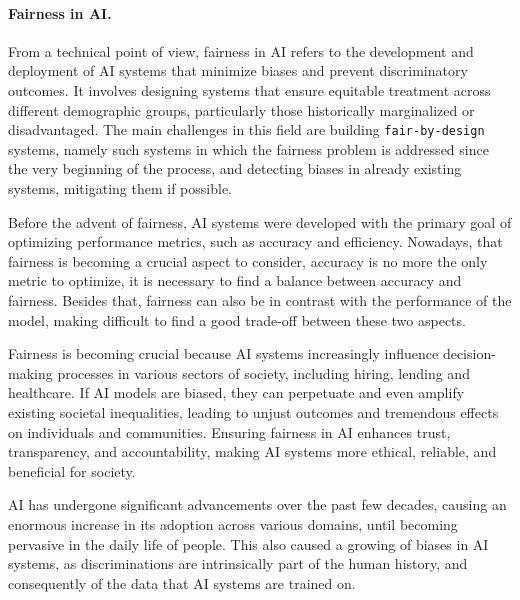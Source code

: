 \documentclass[12pt,a4paper,openright,twoside]{book}
\begin{document}
\paragraph{Fairness in \acs{AI}.}

From a technical point of view, fairness in \ac{AI} refers to the development and deployment of \ac{AI} systems that minimize biases and prevent discriminatory outcomes.
%
It involves designing systems that ensure equitable treatment across different demographic groups, particularly those historically marginalized or disadvantaged.
%
%
The main challenges in this field are building \texttt{fair-by-design} systems, namely such systems in which the fairness problem is addressed since the very beginning of the process, and detecting biases in already existing systems, mitigating them if possible.
%

Before the advent of fairness, \ac{AI} systems were developed with the primary goal of optimizing performance metrics, such as accuracy and efficiency. Nowadays, that fairness is becoming a crucial aspect to consider, accuracy is no more the only metric to optimize, it is necessary to find a balance between accuracy and fairness. Besides that, fairness can also be in contrast with the performance of the model, making difficult to find a good trade-off between these two aspects.

Fairness is becoming crucial because \ac{AI} systems increasingly influence decision-making processes in various sectors of society, including hiring, lending and healthcare.
%
If \ac{AI} models are biased, they can perpetuate and even amplify existing societal inequalities, leading to unjust outcomes and tremendous effects on individuals and communities.
%
Ensuring fairness in \ac{AI} enhances trust, transparency, and accountability, making \ac{AI} systems more ethical, reliable, and beneficial for society.

\ac{AI} has undergone significant advancements over the past few decades, causing an enormous increase in its adoption across various domains, until becoming pervasive in the daily life of people.
%
This also caused a growing of biases in \ac{AI} systems, as discriminations are intrinsically part of the human history, and consequently of the data that \ac{AI} systems are trained on.
\end{document}

